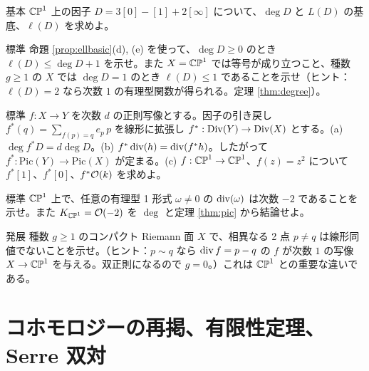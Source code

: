 \begin{prob}{基本}\label{p:LD}
$\mathbb{CP}^1$ 上の因子 $D=3[0]-[1]+2[\infty]$ について、$\deg D$ と $L(D)$ の基底、$\ell(D)$ を求めよ。
\end{prob}
\begin{prob}{標準}\label{p:eldim}
命題 \ref{prop:ellbasic}(d), (e) を使って、$\deg D\ge0$ のとき $\ell(D)\le\deg D+1$ を示せ。また $X=\mathbb{CP}^1$ では等号が成り立つこと、種数 $g\ge1$ の $X$ では $\deg D=1$ のとき $\ell(D)\le1$ であることを示せ（ヒント：$\ell(D)=2$ なら次数 $1$ の有理型関数が得られる。定理 \ref{thm:degree}）。
\end{prob}
\begin{prob}{標準}\label{p:pullback}
$f:X\to Y$ を次数 $d$ の正則写像とする。因子の引き戻し $f^*(q)=\sum_{f(p)=q}e_p\,p$ を線形に拡張し $f^*:\mathrm{Div}(Y)\to\mathrm{Div}(X)$ とする。(a) $\deg f^*D=d\deg D$。(b) $f^*\operatorname{div}(h)=\operatorname{div}(f^*h)$。したがって $f^*:\mathrm{Pic}(Y)\to\mathrm{Pic}(X)$ が定まる。(c) $f:\mathbb{CP}^1\to\mathbb{CP}^1$、$f(z)=z^2$ について $f^*[1]$、$f^*[0]$、$f^*\mathcal O(k)$ を求めよ。
\end{prob}
\begin{prob}{標準}\label{p:Kp1}
$\mathbb{CP}^1$ 上で、任意の有理型 1 形式 $\omega\ne0$ の $\operatorname{div}(\omega)$ は次数 $-2$ であることを示せ。また $K_{\mathbb{CP}^1}=\mathcal O(-2)$ を $\deg$ と定理 \ref{thm:pic} から結論せよ。
\end{prob}
\begin{prob}{発展}\label{p:distinct}
種数 $g\ge1$ のコンパクト Riemann 面 $X$ で、相異なる 2 点 $p\ne q$ は線形同値でないことを示せ。（ヒント：$p\sim q$ なら $\operatorname{div} f=p-q$ の $f$ が次数 $1$ の写像 $X\to\mathbb{CP}^1$ を与える。双正則になるので $g=0$。）これは $\mathbb{CP}^1$ との重要な違いである。
\end{prob}

\section{コホモロジーの再掲、有限性定理、Serre 双対}\label{sec:coh}

